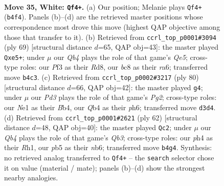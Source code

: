 \documentclass[11pt]{article}
\begin{document}
\clearpage

\begin{figure}[p]\centering
\begin{subfigure}{0.46\textwidth}\centering
\resizebox{\linewidth}{!}{%
\newchessgame
\chessboard[
  setfen={n1b4r/8/7k/1p6/1Q4pp/P2P1P2/7K/4Nq2 w - - 0 35},
  showmover=false,
  pgfstyle=straightmove, color=movearrow, markmove={b4-f4}
]}
\caption{}
\end{subfigure}\hfill
\begin{subfigure}{0.46\textwidth}\centering
\resizebox{\linewidth}{!}{%
\newchessgame
\chessboard[
  setfen={3r2k1/5p2/R3P1pQ/1p2P2n/4q3/8/3R1P1K/8 b - - 0 35},
  showmover=false,
  pgfstyle=straightmove, color=movearrow, markmove={e4-e5}
]}
\caption{}
\end{subfigure}
\\[4pt]
\begin{subfigure}{0.46\textwidth}\centering
\resizebox{\linewidth}{!}{%
\newchessgame
\chessboard[
  setfen={7k/5bp1/5p1p/8/1B2qN1P/1nQ1P3/5KP1/8 w - - 0 41},
  showmover=false,
  pgfstyle=straightmove, color=movearrow, markmove={g2-g4}
]}
\caption{}
\end{subfigure}\hfill
\begin{subfigure}{0.46\textwidth}\centering
\resizebox{\linewidth}{!}{%
\newchessgame
\chessboard[
  setfen={3r2k1/5p2/1n2p3/4P3/8/1Q3N2/1P2q1P1/1K5R w - - 2 32},
  showmover=false,
  pgfstyle=straightmove, color=movearrow, markmove={b3-c2}
]}
\caption{}
\end{subfigure}
\caption{\textbf{Move 35, White: \texttt{Qf4+}.} (a) Our position; Melanie plays \texttt{Qf4+} (\texttt{b4f4}). Panels (b)--(d) are the retrieved master positions whose correspondence most drove this move (highest QAP objective among those that transfer to it). (b) Retrieved from \texttt{ccrl\_top\_p0001\#3094} (ply 69) [structural distance $d$=65, QAP obj=43]: the master played \texttt{Qxe5+}; under $\mu$ our \emph{Qb4} plays the role of that game's \emph{Qe5}; cross-type roles: our \emph{P}f3 as their \emph{R}d8, our \emph{b}c8 as their \emph{r}a6; transferred move \texttt{b4c3}. (c) Retrieved from \texttt{ccrl\_top\_p0002\#3217} (ply 80) [structural distance $d$=66, QAP obj=42]: the master played \texttt{g4}; under $\mu$ our \emph{Pd3} plays the role of that game's \emph{Pg2}; cross-type roles: our \emph{N}e1 as their \emph{B}b4, our \emph{Q}b4 as their \emph{p}h6; transferred move \texttt{d3d4}. (d) Retrieved from \texttt{ccrl\_top\_p0001\#2621} (ply 62) [structural distance $d$=48, QAP obj=40]: the master played \texttt{Qc2}; under $\mu$ our \emph{Qb4} plays the role of that game's \emph{Qb3}; cross-type roles: our \emph{p}h4 as their \emph{R}h1, our \emph{p}b5 as their \emph{n}b6; transferred move \texttt{b4g4}. Synthesis: no retrieved analog transferred to \texttt{Qf4+} -- the \texttt{search} selector chose it on value (material / mate); panels (b)--(d) show the strongest nearby analogies.}
\label{fig:thought-m68}
\end{figure}
\end{document}
